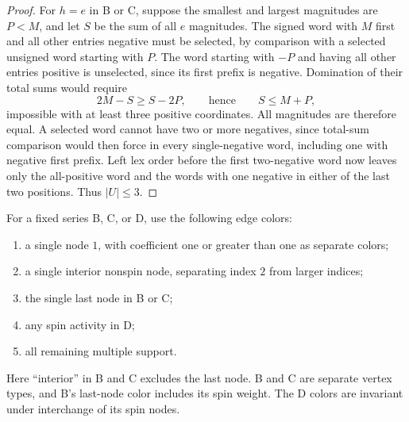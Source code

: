 \begin{proof}
For $h=e$ in B or C, suppose the smallest and largest magnitudes are
$P<M$, and let $S$ be the sum of all $e$ magnitudes. The signed word
with $M$ first and all other entries negative must be selected, by
comparison with a selected unsigned word starting with $P$. The word
starting with $-P$ and having all other entries positive is unselected,
since its first prefix is negative. Domination of their total sums
would require
\[
 2M-S\ge S-2P,\qquad\text{hence}\qquad S\le M+P,
\]
impossible with at least three positive coordinates. All magnitudes
are therefore equal. A selected word cannot have two or more negatives,
since total-sum comparison would then force in every single-negative
word, including one with negative first prefix. Left lex order before
the first two-negative word now leaves only the all-positive word and
the words with one negative in either of the last two positions.
Thus $|U|\le3$.
\end{proof}

For a fixed series B, C, or D, use the following edge colors:
\begin{enumerate}
\item a single node $1$, with coefficient one or greater than one as separate colors;
\item a single interior nonspin node, separating index $2$ from larger indices;
\item the single last node in B or C;
\item any spin activity in D;
\item all remaining multiple support.
\end{enumerate}
Here ``interior'' in B and C excludes the last node. B and C are separate vertex types, and B's last-node color includes its spin weight. The D colors are invariant under interchange of its spin nodes.

